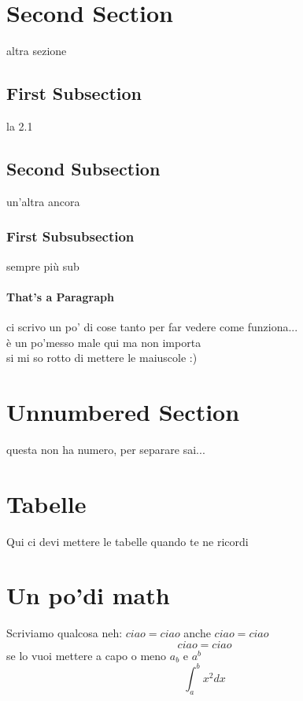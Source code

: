 \documentclass[12pt, letterpaper, twoside]{article}  %
\begin{document}
\section{Second Section}
altra sezione

\subsection{First Subsection}
la 2.1

\subsection{Second Subsection}
un'altra ancora

\subsubsection{First Subsubsection}
sempre più sub

\paragraph{That's a Paragraph}
ci scrivo un po' di cose tanto per far vedere come funziona...
\\è un po'messo male qui ma non importa
\\si mi so rotto di mettere le maiuscole :)

\section*{Unnumbered Section}
questa non ha numero, per separare sai...

\section{Tabelle}
Qui ci devi mettere le tabelle quando te ne ricordi

\section{Un po'di math}
Scriviamo qualcosa neh:
$ciao = ciao$ anche \(ciao = ciao\)
\[ciao = ciao\]
se lo vuoi mettere a capo o meno $a_b$ e $a^b$
\[ \int_a^b x^2dx \]
\end{document}
